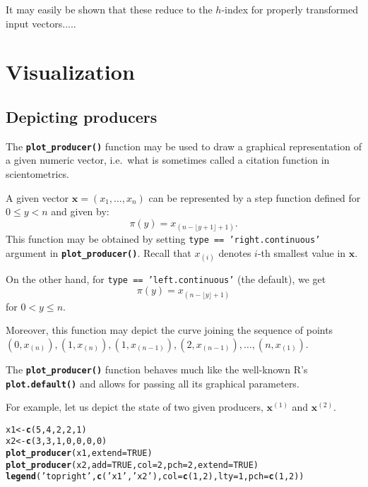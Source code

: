 \documentclass[11pt]{article}\usepackage{graphicx, color}
\makeatletter
\newcommand{\hlfunctioncall}[1]{\textcolor[rgb]{0.501960784313725,0,0.329411764705882}{\textbf{#1}}}%
\newcommand{\hlstring}[1]{\textcolor[rgb]{0.6,0.6,1}{#1}}%
\newenvironment{kframe}{%
 \def\at@end@of@kframe{}%
 \ifinner\ifhmode%
  \def\at@end@of@kframe{\end{minipage}}%
  \begin{minipage}{\columnwidth}%
 \fi\fi%
 \def\FrameCommand##1{\hskip\@totalleftmargin \hskip-\fboxsep
 \colorbox{shadecolor}{##1}\hskip-\fboxsep
     \hskip-\linewidth \hskip-\@totalleftmargin \hskip\columnwidth}%
 \MakeFramed {\advance\hsize-\width
   \@totalleftmargin\z@ \linewidth\hsize
   \@setminipage}}%
 {\par\unskip\endMakeFramed%
 \at@end@of@kframe}
\newenvironment{knitrout}{}{} %
\newcommand{\lang}[1]{\textsf{#1}\xspace}
\newcommand{\R}{\lang{R}}
\newcommand{\Rfunc}[1]{\texttt{\hlfunctioncall{#1}}}
\newcommand{\vect}[1]{{\mathbf{#1}}}
\theoremstyle{remark}
\theoremstyle{definition}
\makeatother
\begin{document}
It may easily be shown that these reduce to the $h$-index for
properly transformed input vectors.....



\section{Visualization}


\subsection{Depicting producers}

The \Rfunc{plot\_producer()} function may be used to draw
a graphical representation of a given numeric vector,
i.e.~what is sometimes called a citation function in scientometrics.

A given vector $\mathbf{x}=(x_1,\dots,x_n)$ can be represented by a
step function defined for $0\le y<n$ and given by:
\[
   \pi(y)=x_{(n-\lfloor y+1\rfloor+1)}.
\]
This function may be obtained by setting \texttt{type == 'right.continuous'}
argument in \Rfunc{plot\_pro\-du\-cer()}.
Recall that $x_{(i)}$ denotes $i$-th smallest value in $\vect{x}$.

On the other hand, for \texttt{type == 'left.continuous'}
(the default), we get
\[
\pi(y)=x_{(n-\lfloor y\rfloor+1)}
\]
for $0< y\le n$.

Moreover, this function may depict the curve joining the sequence
of points $(0, x_{(n)}), (1, x_{(n)}),\allowbreak (1, x_{(n-1)}), (2, x_{(n-1)}),
\dots, (n, x_{(1)})$.


\medskip
The \Rfunc{plot\_producer()} function behaves much like
the well-known \R's \Rfunc{plot.default()} and allows for passing
all its graphical parameters.

For example, let us depict the state of two given producers,
$\vect{x}^{(1)}$ and $\vect{x}^{(2)}$.

\begin{knitrout}\small
{}\color{fgcolor}\begin{kframe}
\begin{alltt}
x1 <- \hlfunctioncall{c}(5, 4, 2, 2, 1)
x2 <- \hlfunctioncall{c}(3, 3, 1, 0, 0, 0, 0)
\hlfunctioncall{plot_producer}(x1, extend=TRUE)
\hlfunctioncall{plot_producer}(x2, add=TRUE, col=2, pch=2, extend=TRUE)
\hlfunctioncall{legend}(\hlstring{'topright'}, \hlfunctioncall{c}(\hlstring{'x1'}, \hlstring{'x2'}), col=\hlfunctioncall{c}(1, 2), lty=1, pch=\hlfunctioncall{c}(1, 2))
\end{alltt}
\end{kframe}
\end{knitrout}
\end{document}
